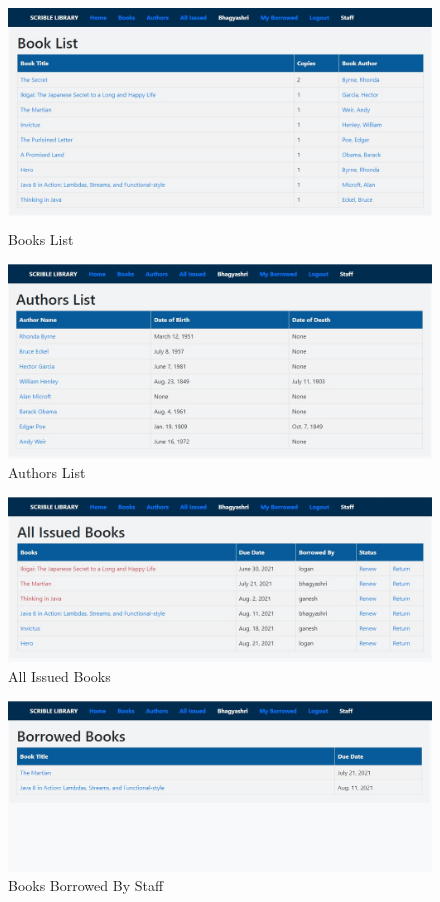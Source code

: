 \newpage
\begin{figure}[htb]
	\centering
	\includegraphics[width=12cm, height=6cm, angle=90]{./books} 
	\caption{Books List}
	\label{fig:label} 
\end{figure}
\newpage
\begin{figure}[htb]
	\centering
	\includegraphics[scale=0.4, angle=90]{./authors} 
	\caption{Authors List}
	\label{fig:label} 
\end{figure}
\newpage
\begin{figure}[htb]
	\centering
	\includegraphics[scale=0.4, angle=90]{./issued} 
	\caption{All Issued Books}
	\label{fig:label} 
\end{figure}
\newpage
\begin{figure}[htb]
	\centering
	\includegraphics[scale=0.4, angle=90]{./borrowed} 
	\caption{Books Borrowed By Staff}
	\label{fig:label} 
\end{figure}
